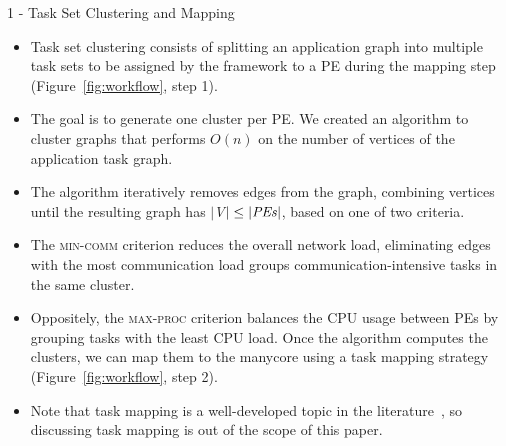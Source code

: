 \begin{frame}{1 - Task Set Clustering and Mapping}
	\begin{itemize}
	\item Task set clustering consists of splitting an application graph into multiple task sets to be assigned by the framework to a PE during the mapping step (Figure~\ref{fig:workflow}, step 1). 
	
	\item The goal is to generate one cluster per PE. We created an algorithm to cluster graphs that performs $O(n)$  on the number of vertices of the application task graph. 
	
	\item The algorithm iteratively removes edges from the graph, combining vertices until the resulting graph has $|$\textit{V}$| \leq |\text{\textit{PEs}}|$, based on one of two criteria. 
	
	\item The \textsc{min-comm} criterion reduces the overall network load, eliminating edges with the most communication load groups communication-intensive tasks in the same cluster. 
	
	\item Oppositely, the \textsc{max-proc} criterion balances the CPU usage between PEs by grouping tasks with the least CPU load. Once the algorithm computes the clusters, we can map them to the manycore using a task mapping strategy (Figure~\ref{fig:workflow}, step 2). 
	
	\item Note that task mapping is a well-developed topic in the literature~\cite{Singh:2013}, so discussing task mapping is out of the scope of this paper.
	\end{itemize}
\end{frame}

